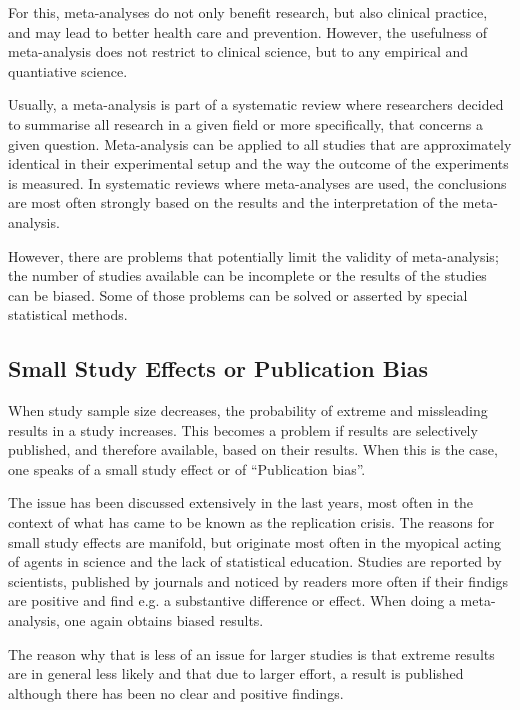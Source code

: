 \documentclass[11pt,a4paper,twoside]{book}\usepackage[]{graphicx}\usepackage[]{color}
\begin{document}
\vspace{0mm}
For this, meta-analyses do not only benefit research, but also clinical practice, and may lead to better health care and prevention. However, the usefulness of meta-analysis does not restrict to clinical science, but to any empirical and quantiative science. 

\vspace{0mm}
Usually, a meta-analysis is part of a systematic review where researchers decided to summarise all research in a given field or more specifically, that concerns a given question. Meta-analysis can be applied to all studies that are approximately identical in their experimental setup and the way the outcome of the experiments is measured. In systematic reviews where meta-analyses are used, the conclusions are most often strongly based on the results and the interpretation of the meta-analysis.

\vspace{0mm}
However, there are problems that potentially limit the validity of meta-analysis; the number of studies available can be incomplete or the results of the studies can be biased. Some of those problems can be solved or asserted by special statistical methods. 

\subsection{Small Study Effects or Publication Bias}
When study sample size decreases, the probability of extreme and missleading results in a study increases. This becomes a problem if results are selectively published, and therefore available, based on their results. When this is the case, one speaks of a small study effect or of ``Publication bias''. 

\vspace{0mm}
The issue has been discussed extensively in the last years, most often in the context of what has came to be known as the replication crisis. The reasons for small study effects are manifold, but originate most often in the myopical acting of agents in science and the lack of statistical education. Studies are reported by scientists, published by journals and noticed by readers more often if their findigs are positive and find e.g. a substantive difference or effect. When doing a meta-analysis, one again obtains biased results. 

\vspace{0mm}
The reason why that is less of an issue for larger studies is that extreme results are in general less likely and that due to larger effort, a result is published although there has been no clear and positive findings.
\end{document}
